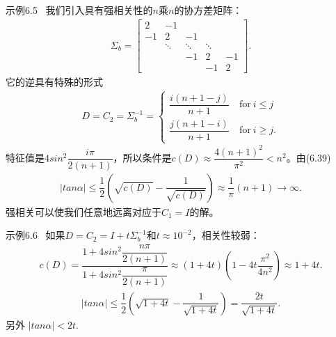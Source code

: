 示例6.5 \ 我们引入具有强相关性的$n$乘$n$的协方差矩阵：
\begin{align*}
\Sigma_{b} =
\begin{bmatrix}
2    &    -1          &        &        & \\
-1   &     2    &    -1        &        & \\
&       \ddots  &  \ddots      & \ddots & \\
&          &         -1    &   2    &  -1 \\
&          &          &       -1    &   2
\end{bmatrix}.
\end{align*}
它的逆具有特殊的形式
\begin{align*}
D = C_{2} = \Sigma^{-1}_{b} =
\left\{
\begin{aligned}
\dfrac{i(n+1-j)}{n+1} \quad \text{for} \ i\leq j\\
\dfrac{j(n+1-i)}{n+1} \quad \text{for} \ i\geq j.
\end{aligned}
\right.
\end{align*}
特征值是$ 4sin^{2} \dfrac{i\pi}{2(n+1)}$，所以条件是$ c(D) \approx \dfrac{4(n+1)^{2}}{\pi^{2}} < n^{2} $。由(6.39)
\begin{align*}
\lvert tan \alpha \rvert \leq \dfrac{1}{2} ( \sqrt{c(D)} - \dfrac{1}{\sqrt{c(D)}}) \approx \dfrac{1}{\pi} (n+1) \rightarrow \infty.
\end{align*}
强相关可以使我们任意地远离对应于$C_{1}=I$的解。

示例6.6 \ 如果$ D = C_{2} = I +t\Sigma^{-1}_{b}$和$ t \approx 10^{-2}$，相关性较弱：
\begin{align*}
c(D) = \dfrac{1+4sin^{2}\dfrac{n\pi}{2(n+1)}}{1+4sin^{2}\dfrac{\pi}{2(n+1)}} \approx 
(1+4t)(1-4t\dfrac{\pi^{2}}{4n^{2}}) \approx 1+4t.
\end{align*}
\begin{align*}
\lvert tan \alpha \rvert \leq \dfrac{1}{2} (\sqrt{1+4t} - \dfrac{1}{\sqrt{1+4t}}) = \dfrac{2t}{\sqrt{1+4t}}.
\end{align*}
另外 $\lvert tan \alpha \rvert < 2t $.